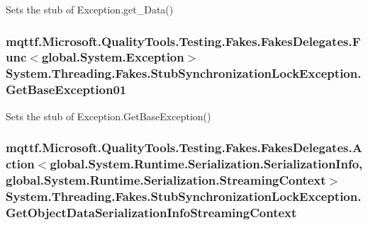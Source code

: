 Sets the stub of Exception.\-get\-\_\-\-Data()

\hypertarget{class_system_1_1_threading_1_1_fakes_1_1_stub_synchronization_lock_exception_a79b9d7849ee309424f582f80ccc414cb}{
\subsubsection[{Get\-Base\-Exception01}]{\setlength{\rightskip}{0pt plus 5cm}mqttf.\-Microsoft.\-Quality\-Tools.\-Testing.\-Fakes.\-Fakes\-Delegates.\-Func$<$global.\-System.\-Exception$>$ System.\-Threading.\-Fakes.\-Stub\-Synchronization\-Lock\-Exception.\-Get\-Base\-Exception01}}\label{class_system_1_1_threading_1_1_fakes_1_1_stub_synchronization_lock_exception_a79b9d7849ee309424f582f80ccc414cb}


Sets the stub of Exception.\-Get\-Base\-Exception()

\hypertarget{class_system_1_1_threading_1_1_fakes_1_1_stub_synchronization_lock_exception_a31809ddc4bcf2ec94213b36a7805bbf4}{
\subsubsection[{Get\-Object\-Data\-Serialization\-Info\-Streaming\-Context}]{\setlength{\rightskip}{0pt plus 5cm}mqttf.\-Microsoft.\-Quality\-Tools.\-Testing.\-Fakes.\-Fakes\-Delegates.\-Action$<$global.\-System.\-Runtime.\-Serialization.\-Serialization\-Info, global.\-System.\-Runtime.\-Serialization.\-Streaming\-Context$>$ System.\-Threading.\-Fakes.\-Stub\-Synchronization\-Lock\-Exception.\-Get\-Object\-Data\-Serialization\-Info\-Streaming\-Context}}\label{class_system_1_1_threading_1_1_fakes_1_1_stub_synchronization_lock_exception_a31809ddc4bcf2ec94213b36a7805bbf4}



